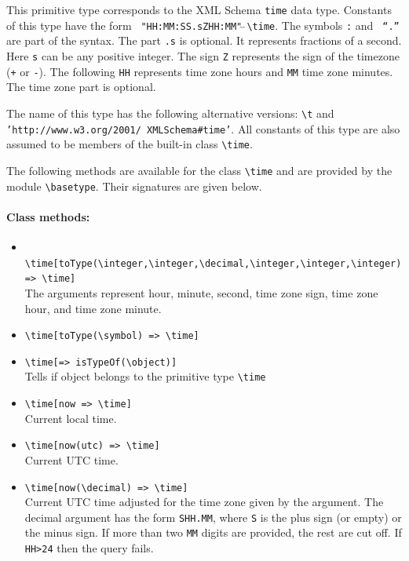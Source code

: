 \documentclass[11pt]{article}
\newcommand{\bs}{\textbackslash}
\begin{document}
\index{datatype!\bs{}time}
This primitive type corresponds to the XML Schema {\tt time} data type.
Constants of this type have the form {\tt
  "HH:MM:SS.sZHH:MM"$\hat{~}\hat{~}$\bs{}time}.  The symbols {\tt :} and {\tt
  ``.''}  are part of the syntax. The part {\tt .s} is optional. It represents
fractions of a second. Here {\tt s} can be any positive integer. The sign
{\tt Z} represents the sign of the timezone ({\tt +} or {\tt -}). The
following {\tt HH} represents time zone hours and {\tt MM} time zone
minutes. The time zone part is optional.


\index{class!\bs{}time}
The name of this type has the following alternative versions:
{\tt \bs{}t} and  {\tt 'http://www.w3.org/2001/ XMLSchema\#time'}. 
All constants of this type are also assumed to be members of the built-in
class {\tt \bs{}time}. 

The following methods are available for the class {\tt \bs{}time} and are
provided by the module {\tt \bs{}basetype}.  Their signatures are given below.
\paragraph{Class methods:}
\begin{itemize}
\item {\tt
    \bs{}time[toType(\bs{}integer,\bs{}integer,\bs{}decimal,\bs{}integer,\bs{}integer,\bs{}integer)
    => \bs{}time]}
  \\
  The arguments represent hour, minute, second, time zone sign, time
  zone hour, and time zone minute.
\item {\tt \bs{}time[toType(\bs{}symbol) => \bs{}time]}
\item {\tt \bs{}time[=> isTypeOf(\bs{}object)]}
  \\
  Tells if object belongs to the primitive type {\tt \bs{}time}  
\item \texttt{\bs{}time[now => \bs{}time]} \\
  Current local time.
\item \texttt{\bs{}time[now(utc) => \bs{}time]} \\
  Current UTC time.
\item \texttt{\bs{}time[now(\bs{}decimal) => \bs{}time]} \\
  Current UTC time adjusted for the time zone given by the
  argument.
  The decimal argument has the form \texttt{SHH.MM}, where \texttt{S} is
  the plus sign (or empty) or the minus sign.
  If more than two \texttt{MM} digits are provided, the rest are cut off.
  If \texttt{HH>24} then the query fails. 
\end{itemize}
\end{document}
